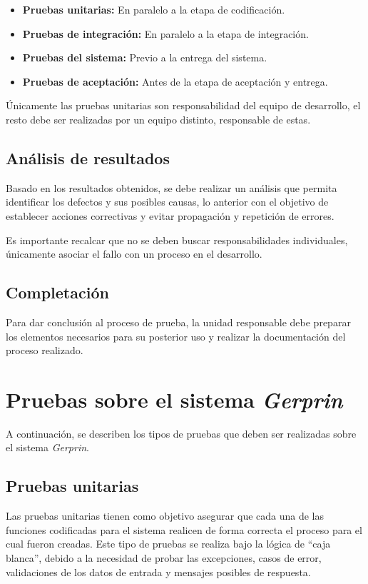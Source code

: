 \begin{itemize}
	\item
		\textbf{Pruebas unitarias:} En paralelo a la etapa de codificación.
	\item
		\textbf{Pruebas de integración:} En paralelo a la etapa de integración.
	\item 
		\textbf{Pruebas del sistema:} Previo a la entrega del sistema.
	\item
		\textbf{Pruebas de aceptación:} Antes de la etapa de aceptación y entrega.
\end{itemize}

Únicamente las pruebas unitarias son responsabilidad del equipo de desarrollo, el resto debe ser realizadas por un equipo distinto, responsable de estas.

\subsection{Análisis de resultados}

Basado en los resultados obtenidos, se debe realizar un análisis que permita identificar los defectos y sus posibles causas, lo anterior con el objetivo de establecer acciones correctivas y evitar propagación y repetición de errores.

Es importante recalcar que no se deben buscar responsabilidades individuales, únicamente asociar el fallo con un proceso en el desarrollo.

\subsection{Completación}

Para dar conclusión al proceso de prueba, la unidad responsable debe preparar los elementos necesarios para su posterior uso y realizar la documentación del proceso realizado.

\section{Pruebas sobre el sistema \textit{Gerprin}}

A continuación, se describen los tipos de pruebas que deben ser realizadas sobre el sistema \textit{Gerprin}. 

\subsection{Pruebas unitarias}

Las pruebas unitarias tienen como objetivo asegurar que cada una de las funciones codificadas para el sistema realicen de forma correcta el proceso para el cual fueron creadas. Este tipo de pruebas se realiza bajo la lógica de “caja blanca”, debido a la necesidad de probar las excepciones, casos de error, validaciones de los datos de entrada y mensajes posibles de respuesta.

